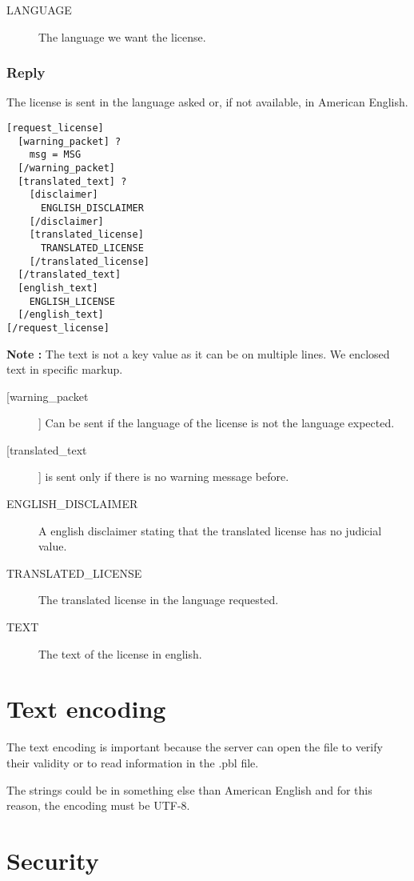 \begin{description}
 \item [LANGUAGE] The language we want the license. 
\end{description}

\subsubsection{Reply}

The license is sent in the language asked or, if not available, in American English.

\begin{lstlisting}
[request_license]
  [warning_packet] ?
    msg = MSG
  [/warning_packet]
  [translated_text] ?
    [disclaimer]
      ENGLISH_DISCLAIMER
    [/disclaimer]
    [translated_license]
      TRANSLATED_LICENSE
    [/translated_license]
  [/translated_text]
  [english_text]
    ENGLISH_LICENSE
  [/english_text]
[/request_license]
\end{lstlisting}
\vspace{15pt}

\textbf{Note :} The text is not a key value as it can be on multiple lines. We enclosed text in specific markup.
\begin{description}
 \item [[warning\_packet]] Can be sent if the language of the license is not the language expected.
 \item[[translated\_text]] is sent only if there is no warning message before.
 \item [ENGLISH\_DISCLAIMER] A english disclaimer stating that the translated license has no judicial value.
 \item [TRANSLATED\_LICENSE] The translated license in the language requested.
 \item [TEXT] The text of the license in english.
\end{description}

\section{Text encoding}

The text encoding is important because the server can open the file to verify their validity or to read
information in the .pbl file.

The strings could be in something else than American English and for this reason, the encoding must be UTF-8.

\section{Security}
\label{section:security}


